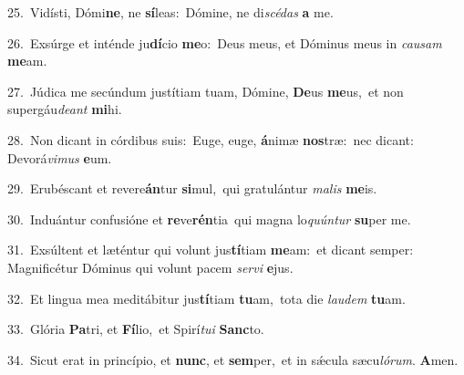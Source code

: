 {\numbfont\textcolor{\numbcolor}{25.}}~Vidísti, Dómi\-\textbf{ne}\-, ne \textbf{sí}\-leas:~\star Dómine, ne di\-\textit{scé}\-\textit{das} \textbf{a} me.\par
{\numbfont\textcolor{\numbcolor}{26.}}~Exsúrge et inténde ju\-\textbf{dí}\-cio \textbf{me}\-o:~\star Deus meus, et Dóminus meus in \textit{cau}\-\textit{sam} \textbf{me}\-am.\par
{\numbfont\textcolor{\numbcolor}{27.}}~Júdica me secúndum justítiam tuam, Dómine, \textbf{De}\-us \textbf{me}\-us,~\star et non supergáu\-\textit{de}\-\textit{ant} \textbf{mi}\-hi.\par
{\numbfont\textcolor{\numbcolor}{28.}}~Non dicant in córdibus suis:~\dagger Euge, euge, \textbf{á}\-nimæ \textbf{nos}\-træ:~\star nec dicant: Devorá\-\textit{vi}\-\textit{mus} \textbf{e}\-um.\par
{\numbfont\textcolor{\numbcolor}{29.}}~Erubéscant et revere\-\textbf{án}\-tur \textbf{si}\-mul,~\star qui gratulántur \textit{ma}\-\textit{lis} \textbf{me}\-is.\par
{\numbfont\textcolor{\numbcolor}{30.}}~Induántur confusióne et \textbf{re}\-ve\-\textbf{rén}\-tia~\star qui magna lo\-\textit{quún}\-\textit{tur} \textbf{su}\-per me.\par
{\numbfont\textcolor{\numbcolor}{31.}}~Exsúltent et læténtur qui volunt jus\-\textbf{tí}\-tiam \textbf{me}\-am:~\star et dicant semper: Magnificétur Dóminus qui volunt pacem \textit{ser}\-\textit{vi} \textbf{e}\-jus.\par
{\numbfont\textcolor{\numbcolor}{32.}}~Et lingua mea meditábitur jus\-\textbf{tí}\-tiam \textbf{tu}\-am,~\star tota die \textit{lau}\-\textit{dem} \textbf{tu}\-am.\par
{\numbfont\textcolor{\numbcolor}{33.}}~Glória \textbf{Pa}\-tri, et \textbf{Fí}\-lio,~\star et Spirí\-\textit{tu}\-\textit{i} \textbf{Sanc}\-to.\par
{\numbfont\textcolor{\numbcolor}{34.}}~Sicut erat in princípio, et \textbf{nunc}\-, et \textbf{sem}\-per,~\star et in sǽcula sæcu\-\textit{ló}\-\textit{rum}. \textbf{A}\-men.\par

